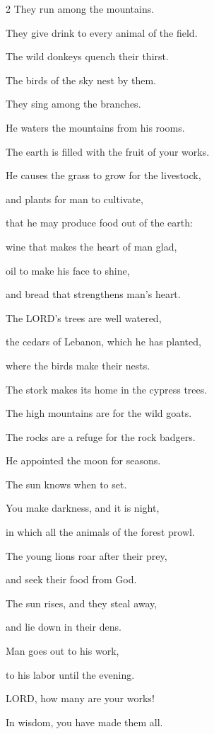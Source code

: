 \begin{multicols}{2}
	They run among the mountains.
	
	
	\myverse{}They give drink to every animal of the field.
	
	The wild donkeys quench their thirst.
	
	
	\myverse{}The birds of the sky nest by them.
	
	They sing among the branches.
	
	
	\myverse{}He waters the mountains from his rooms.
	
	The earth is filled with the fruit of your works.
	
	
	\myverse{}He causes the grass to grow for the livestock,
	
	and plants for man to cultivate,
	
	that he may produce food out of the earth:
	
	
	\myverse{}wine that makes the heart of man glad,
	
	oil to make his face to shine,
	
	and bread that strengthens man’s heart.
	
	
	\myverse{}The LORD’s trees are well watered,
	
	the cedars of Lebanon, which he has planted,
	
	
	\myverse{}where the birds make their nests.
	
	The stork makes its home in the cypress trees.
	
	
	\myverse{}The high mountains are for the wild goats.
	
	The rocks are a refuge for the rock badgers.
	
	
	\myverse{}He appointed the moon for seasons.
	
	The sun knows when to set.
	
	
	\myverse{}You make darkness, and it is night,
	
	in which all the animals of the forest prowl.
	
	
	\myverse{}The young lions roar after their prey,
	
	and seek their food from God.
	
	
	\myverse{}The sun rises, and they steal away,
	
	and lie down in their dens.
	
	
	\myverse{}Man goes out to his work,
	
	to his labor until the evening.
	
	
	\myverse{}LORD, how many are your works!
	
	In wisdom, you have made them all.
	

\end{multicols}
